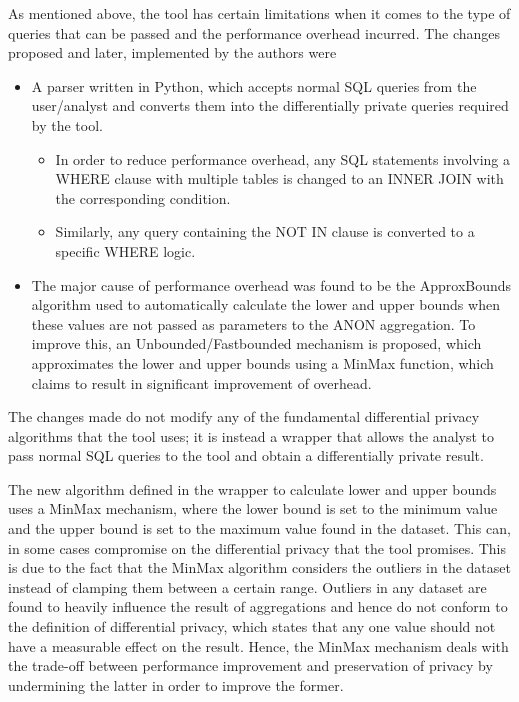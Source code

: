 \documentclass[acmsmall]{acmart}
\begin{document}
As mentioned above, the tool has certain limitations when it comes to the type of queries that can be passed and the performance overhead incurred. The changes proposed and later, implemented by the authors were
\begin{itemize}
    \item A parser written in Python, which accepts normal SQL queries from the user/analyst and converts them into the differentially private queries required by the tool.
    \begin{itemize}
        \item In order to reduce performance overhead, any SQL statements involving a WHERE clause with multiple tables is changed to an INNER JOIN with the corresponding condition.
        \item Similarly, any query containing the NOT IN clause is converted to a specific WHERE logic.
    \end{itemize}
    \item The major cause of performance overhead was found to be the ApproxBounds algorithm used to automatically calculate the lower and upper bounds when these values are not passed as parameters to the ANON aggregation. To improve this, an Unbounded/Fastbounded mechanism is proposed, which approximates the lower and upper bounds using a MinMax function, which claims to result in significant improvement of overhead.
\end{itemize}
The changes made do not modify any of the fundamental differential privacy algorithms that the tool uses; it is instead a wrapper that allows the analyst to pass normal SQL queries to the tool and obtain a differentially private result.

The new algorithm defined in the wrapper to calculate lower and upper bounds uses a MinMax mechanism, where the lower bound is set to the minimum value and the upper bound is set to the maximum value found in the dataset. This can, in some cases compromise on the differential privacy that the tool promises. This is due to the fact that the MinMax algorithm considers the outliers in the dataset instead of clamping them between a certain range. Outliers in any dataset are found to heavily influence the result of aggregations and hence do not conform to the definition of differential privacy, which states that any one value should not have a measurable effect on the result. Hence, the MinMax mechanism deals with the trade-off between performance improvement and preservation of privacy by undermining the latter in order to improve the former.
\end{document}
